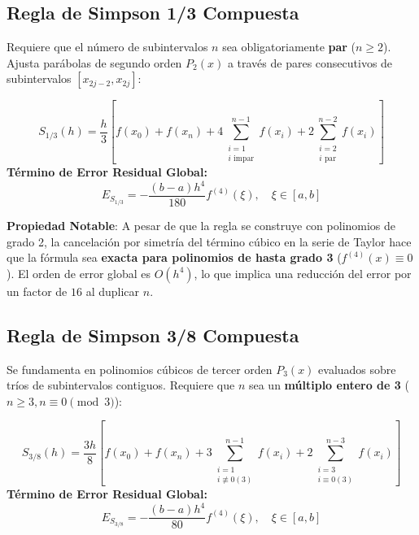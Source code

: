 \documentclass[11pt,a4paper]{article}
\begin{document}
\subsection{Regla de Simpson 1/3 Compuesta}
Requiere que el número de subintervalos $n$ sea obligatoriamente \textbf{par} ($n \ge 2$). Ajusta parábolas de segundo orden $P_2(x)$ a través de pares consecutivos de subintervalos $[x_{2j-2}, x_{2j}]$:
\begin{formulabox}[title=Fórmula de Simpson 1/3 Compuesto]
\begin{equation}
S_{1/3}(h) = \frac{h}{3} \left[ f(x_0) + f(x_n) + 4 \sum_{\substack{i=1 \\ i \text{ impar}}}^{n-1} f(x_i) + 2 \sum_{\substack{i=2 \\ i \text{ par}}}^{n-2} f(x_i) \right]
\end{equation}
\textbf{Término de Error Residual Global:}
\begin{equation}
E_{S_{1/3}} = -\frac{(b - a) h^4}{180} f^{(4)}(\xi), \quad \xi \in [a, b]
\end{equation}
\end{formulabox}
\noindent \textbf{Propiedad Notable}: A pesar de que la regla se construye con polinomios de grado 2, la cancelación por simetría del término cúbico en la serie de Taylor hace que la fórmula sea \textbf{exacta para polinomios de hasta grado 3} ($f^{(4)}(x) \equiv 0$). El orden de error global es $O(h^4)$, lo que implica una reducción del error por un factor de $16$ al duplicar $n$.

\subsection{Regla de Simpson 3/8 Compuesta}
Se fundamenta en polinomios cúbicos de tercer orden $P_3(x)$ evaluados sobre tríos de subintervalos contiguos. Requiere que $n$ sea un \textbf{múltiplo entero de 3} ($n \ge 3, n \equiv 0 \pmod 3$):
\begin{formulabox}[title=Fórmula de Simpson 3/8 Compuesto]
\begin{equation}
S_{3/8}(h) = \frac{3h}{8} \left[ f(x_0) + f(x_n) + 3 \sum_{\substack{i=1 \\ i \not\equiv 0 (3)}}^{n-1} f(x_i) + 2 \sum_{\substack{i=3 \\ i \equiv 0 (3)}}^{n-3} f(x_i) \right]
\end{equation}
\textbf{Término de Error Residual Global:}
\begin{equation}
E_{S_{3/8}} = -\frac{(b - a) h^4}{80} f^{(4)}(\xi), \quad \xi \in [a, b]
\end{equation}
\end{formulabox}
\end{document}
